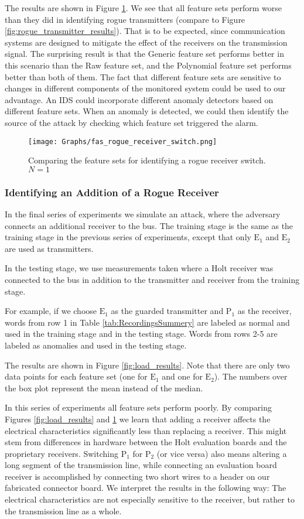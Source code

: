 \documentclass[compsoc,conference,a4paper]{IEEEtran}
\newcommand{\subsublevel}[1]{\subsubsection{#1}}
\newcommand{\subsublevel}[1]{\subsection{#1}}
\begin{document}
  The results are shown in Figure \ref{fig:receiver_results}. We see that all feature sets perform worse than they did in identifying rogue transmitters (compare to Figure \ref{fig:rogue_transmitter_results}). That is to be expected, since communication systems are designed to mitigate the effect of the receivers on the transmission signal. The surprising result is that the Generic feature set performs better in this scenario than the Raw feature set, and the Polynomial feature set performs better than both of them. The fact that different feature sets are sensitive to changes in different components of the monitored system could be used to our advantage. An IDS could incorporate different anomaly detectors based on different feature sets. When an anomaly is detected, we could then identify the source of the attack by checking which feature set triggered the alarm.
  
  \begin{figure}[t]
    \centering
    \texttt{[image: Graphs/fas\_rogue\_receiver\_switch.png]}
    \caption{Comparing the feature sets for identifying a rogue receiver switch. \(N = 1\)}
    \label{fig:receiver_results}
  \end{figure}
  
\subsublevel{Identifying an Addition of a Rogue Receiver}
  In the final series of experiments we simulate an attack, where the adversary connects an additional receiver to the bus. The training stage is the same as the training stage in the previous series of experiments, except that only \(\text{E}_1\) and \(\text{E}_2\) are used as transmitters.
  
  In the testing stage, we use measurements taken where a Holt receiver was connected to the bus in addition to the transmitter and receiver from the training stage.
  
  For example, if we choose \(\text{E}_1\) as the guarded transmitter and \(\text{P}_1\) as the receiver, words from row 1 in Table \ref{tab:RecordingsSummery} are labeled as normal and used in the training stage and in the testing stage. Words from rows 2-5 are labeled as anomalies and used in the testing stage.
  
  The results are shown in Figure \ref{fig:load_results}. Note that there are only two data points for each feature set (one for \(\text{E}_1\) and one for \(\text{E}_2\)). The numbers over the box plot represent the mean instead of the median.
  
  In this series of experiments all feature sets perform poorly. By comparing Figures \ref{fig:load_results} and \ref{fig:receiver_results} we learn that adding a receiver affects the electrical characteristics significantly less than replacing a receiver. This might stem from differences in hardware between the Holt evaluation boards and the proprietary receivers. Switching \(\text{P}_1\) for \(\text{P}_2\) (or vice versa) also means altering a long segment of the transmission line, while connecting an evaluation board receiver is accomplished by connecting two short wires to a header on our fabricated connector board. We interpret the results in the following way: The electrical characteristics are not especially sensitive to the receiver, but rather to the transmission line as a whole.
  
\end{document}
